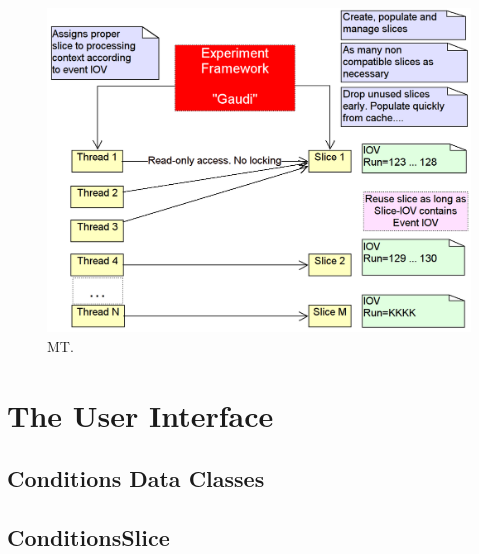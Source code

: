 \documentclass[10pt,a4paper]{article}
\begin{document}
\begin{figure}[h]
  \begin{center}\includegraphics[width=15cm] {DDCond-ConditionsMT.png}
    \caption{MT.}
    \label{fig:ddcond-multi-threaded-processing}
  \end{center}
\end{figure}
\vspace{-0.5cm}

\newpage
\section{The User Interface}
\label{sec:ddcond-user-interface}

\subsection{Conditions Data Classes}
\label{subsec:ddcond-data-classes}

\subsection{ConditionsSlice}
\label{subsec:ddcond-data-classes}
\end{document}

